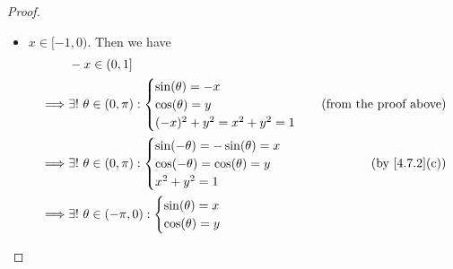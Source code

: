 \begin{proof}
\begin{itemize}
\begin{align*}
             & \big(x \in (0, 1]\big) \land \big(y \in (-1, 0]\big) \implies \exists\ \theta_2 \in [\frac{\pi}{2}, \pi) : \big(\sin(\theta_2) = x\big) \land \big(\cos(\theta_2) = y\big).
          \end{align*}
          But \(\cos\) is strictly decreasing on \((0, \pi)\) implies the choices of \(\theta_1\) and \(\theta_2\) are unique.
          And we conclude that
          \[
            \forall x \in (0, 1], \exists!\ \theta \in (0, \pi) : \begin{cases}
              \sin(\theta) = x \\
              \cos(\theta) = y \\
              x^2 + y^2 = 1
            \end{cases}
          \]
    \item \(x \in [-1, 0)\).
          Then we have
          \begin{align*}
                     & -x \in (0, 1]                                                                \\
            \implies & \exists!\ \theta \in (0, \pi) : \begin{cases}
                                                         \sin(\theta) = -x \\
                                                         \cos(\theta) = y  \\
                                                         (-x)^2 + y^2 = x^2 + y^2 = 1
                                                       \end{cases}  & \text{(from the proof above)} \\
            \implies & \exists!\ \theta \in (0, \pi) : \begin{cases}
                                                         \sin(-\theta) = -\sin(\theta) = x \\
                                                         \cos(-\theta) = \cos(\theta) = y  \\
                                                         x^2 + y^2 = 1
                                                       \end{cases}  & \text{(by \cref{4.7.2}(c))}   \\
            \implies & \exists!\ \theta \in (-\pi, 0) : \begin{cases}
                                                          \sin(\theta) = x \\
                                                          \cos(\theta) = y \\

\end{cases}
\end{align*}
\end{itemize}
\end{proof}
